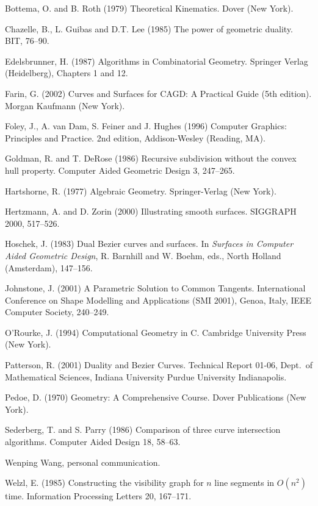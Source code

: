 \documentclass[12pt]{article}
\begin{document}

\begin{thebibliography}{99}	%

Bottema, O. and B. Roth (1979)
Theoretical Kinematics.
Dover (New York).

Chazelle, B., L. Guibas and D.T. Lee (1985)
The power of geometric duality.
BIT, 76--90.

Edelsbrunner, H. (1987)
Algorithms in Combinatorial Geometry.
Springer Verlag (Heidelberg), Chapters 1 and 12.

Farin, G. (2002)
Curves and Surfaces for CAGD: A Practical Guide (5th edition).
Morgan Kaufmann (New York).

Foley, J., A. van Dam, S. Feiner and J. Hughes (1996)
Computer Graphics: Principles and Practice.
2nd edition, Addison-Wesley (Reading, MA).

Goldman, R. and T. DeRose (1986)
Recursive subdivision without the convex hull property.
Computer Aided Geometric Design 3, 247--265.

Hartshorne, R. (1977)
Algebraic Geometry.
Springer-Verlag (New York).

Hertzmann, A. and D. Zorin (2000)
Illustrating smooth surfaces.
SIGGRAPH 2000, 517--526.

Hoschek, J. (1983)
Dual Bezier curves and surfaces.
In {\em Surfaces in Computer Aided Geometric Design},
R. Barnhill and W. Boehm, eds.,
North Holland (Amsterdam), 147--156.

Johnstone, J. (2001)
A Parametric Solution to Common Tangents.
International Conference on Shape Modelling and Applications (SMI 2001), Genoa, Italy,
IEEE Computer Society, 240--249.

O'Rourke, J. (1994)
Computational Geometry in C.
Cambridge University Press (New York).

Patterson, R. (2001)
Duality and Bezier Curves.
Technical Report 01-06, Dept.\ of Mathematical Sciences,
Indiana University Purdue University Indianapolis.

Pedoe, D. (1970)
Geometry: A Comprehensive Course.
Dover Publications (New York).

Sederberg, T. and S. Parry (1986)
Comparison of three curve intersection algorithms.
Computer Aided Design 18, 58--63.

Wenping Wang, personal communication.

Welzl, E. (1985)
Constructing the visibility graph for $n$ line segments
in $O(n^2)$ time.
Information Processing Letters 20, 167--171.

\end{thebibliography}
\end{document}
